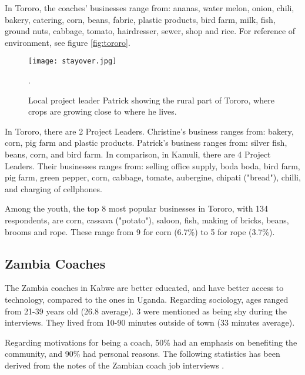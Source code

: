 In Tororo, the coaches' businesses range from: ananas, water melon, onion, chili, bakery, catering, corn, beans, fabric, plastic products, bird farm, milk, fish, ground nuts, cabbage, tomato, hairdresser, sewer, shop and rice. For reference of environment, see figure \ref{fig:tororo}.

\begin{figure}[h]
    \centering
    \texttt{[image: stayover.jpg]}
    \caption{Local project leader Patrick showing the rural part of Tororo, where crops are growing close to where he lives.}.
    \label{fig:duolingo}
\end{figure}

In Tororo, there are 2 Project Leaders. Christine's business ranges from: bakery, corn, pig farm and plastic products. Patrick's business ranges from: silver fish, beans, corn, and bird farm. In comparison, in Kamuli, there are 4 Project Leaders. Their businesses ranges from: selling office supply, boda boda, bird farm, pig farm, green pepper, corn, cabbage, tomate, aubergine, chipati ("bread"), chilli, and charging of cellphones.

Among the youth, the top 8 most popular businesses in Tororo, with 134 respondents, are corn, cassava ("potato"), saloon, fish, making of bricks, beans, brooms and rope. These range from 9 for corn (6.7\%) to 5 for rope (3.7\%).

\subsection{Zambia Coaches}
The Zambia coaches in Kabwe are better educated, and have better access to technology, compared to the ones in Uganda. Regarding sociology, ages ranged from 21-39 years old (26.8 average). 3 were mentioned as being shy during the interviews. They lived from 10-90 minutes outside of town (33 minutes average).

Regarding motivations for being a coach, 50\% had an emphasis on benefiting the community, and 90\% had personal reasons. The following statistics has been derived from the notes of the Zambian coach job interviews \citep{yd-zambia-interviews}.

%

